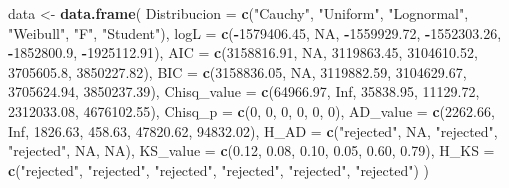 \documentclass[
]{article}
\newenvironment{Shaded}{\begin{snugshade}}{\end{snugshade}}
\newcommand{\AttributeTok}[1]{\textcolor[rgb]{0.13,0.29,0.53}{#1}}
\newcommand{\ConstantTok}[1]{\textcolor[rgb]{0.56,0.35,0.01}{#1}}
\newcommand{\DecValTok}[1]{\textcolor[rgb]{0.00,0.00,0.81}{#1}}
\newcommand{\FloatTok}[1]{\textcolor[rgb]{0.00,0.00,0.81}{#1}}
\newcommand{\FunctionTok}[1]{\textcolor[rgb]{0.13,0.29,0.53}{\textbf{#1}}}
\newcommand{\NormalTok}[1]{#1}
\newcommand{\OtherTok}[1]{\textcolor[rgb]{0.56,0.35,0.01}{#1}}
\newcommand{\SpecialCharTok}[1]{\textcolor[rgb]{0.81,0.36,0.00}{\textbf{#1}}}
\newcommand{\StringTok}[1]{\textcolor[rgb]{0.31,0.60,0.02}{#1}}
\begin{document}
\begin{Shaded}
\begin{Highlighting}[]
\NormalTok{data }\OtherTok{\textless{}{-}} \FunctionTok{data.frame}\NormalTok{(}
  \AttributeTok{Distribucion =} \FunctionTok{c}\NormalTok{(}\StringTok{"Cauchy"}\NormalTok{, }\StringTok{"Uniform"}\NormalTok{, }\StringTok{"Lognormal"}\NormalTok{, }\StringTok{"Weibull"}\NormalTok{, }\StringTok{"F"}\NormalTok{, }\StringTok{"Student"}\NormalTok{),}
  \AttributeTok{logL =} \FunctionTok{c}\NormalTok{(}\SpecialCharTok{{-}}\FloatTok{1579406.45}\NormalTok{, }\ConstantTok{NA}\NormalTok{, }\SpecialCharTok{{-}}\FloatTok{1559929.72}\NormalTok{, }\SpecialCharTok{{-}}\FloatTok{1552303.26}\NormalTok{, }\SpecialCharTok{{-}}\FloatTok{1852800.9}\NormalTok{, }\SpecialCharTok{{-}}\FloatTok{1925112.91}\NormalTok{),}
  \AttributeTok{AIC =} \FunctionTok{c}\NormalTok{(}\FloatTok{3158816.91}\NormalTok{, }\ConstantTok{NA}\NormalTok{, }\FloatTok{3119863.45}\NormalTok{, }\FloatTok{3104610.52}\NormalTok{, }\FloatTok{3705605.8}\NormalTok{, }\FloatTok{3850227.82}\NormalTok{),}
  \AttributeTok{BIC =} \FunctionTok{c}\NormalTok{(}\FloatTok{3158836.05}\NormalTok{, }\ConstantTok{NA}\NormalTok{, }\FloatTok{3119882.59}\NormalTok{, }\FloatTok{3104629.67}\NormalTok{, }\FloatTok{3705624.94}\NormalTok{, }\FloatTok{3850237.39}\NormalTok{),}
  \AttributeTok{Chisq\_value =} \FunctionTok{c}\NormalTok{(}\FloatTok{64966.97}\NormalTok{, }\ConstantTok{Inf}\NormalTok{, }\FloatTok{35838.95}\NormalTok{, }\FloatTok{11129.72}\NormalTok{, }\FloatTok{2312033.08}\NormalTok{, }\FloatTok{4676102.55}\NormalTok{),}
  \AttributeTok{Chisq\_p =} \FunctionTok{c}\NormalTok{(}\DecValTok{0}\NormalTok{, }\DecValTok{0}\NormalTok{, }\DecValTok{0}\NormalTok{, }\DecValTok{0}\NormalTok{, }\DecValTok{0}\NormalTok{, }\DecValTok{0}\NormalTok{),}
  \AttributeTok{AD\_value =} \FunctionTok{c}\NormalTok{(}\FloatTok{2262.66}\NormalTok{, }\ConstantTok{Inf}\NormalTok{, }\FloatTok{1826.63}\NormalTok{, }\FloatTok{458.63}\NormalTok{, }\FloatTok{47820.62}\NormalTok{, }\FloatTok{94832.02}\NormalTok{),}
  \AttributeTok{H\_AD =} \FunctionTok{c}\NormalTok{(}\StringTok{"rejected"}\NormalTok{, }\ConstantTok{NA}\NormalTok{, }\StringTok{"rejected"}\NormalTok{, }\StringTok{"rejected"}\NormalTok{, }\ConstantTok{NA}\NormalTok{, }\ConstantTok{NA}\NormalTok{),}
  \AttributeTok{KS\_value =} \FunctionTok{c}\NormalTok{(}\FloatTok{0.12}\NormalTok{, }\FloatTok{0.08}\NormalTok{, }\FloatTok{0.10}\NormalTok{, }\FloatTok{0.05}\NormalTok{, }\FloatTok{0.60}\NormalTok{, }\FloatTok{0.79}\NormalTok{),}
  \AttributeTok{H\_KS =} \FunctionTok{c}\NormalTok{(}\StringTok{"rejected"}\NormalTok{, }\StringTok{"rejected"}\NormalTok{, }\StringTok{"rejected"}\NormalTok{, }\StringTok{"rejected"}\NormalTok{, }\StringTok{"rejected"}\NormalTok{, }\StringTok{"rejected"}\NormalTok{)}
\NormalTok{)}


\end{Highlighting}
\end{Shaded}
\end{document}
